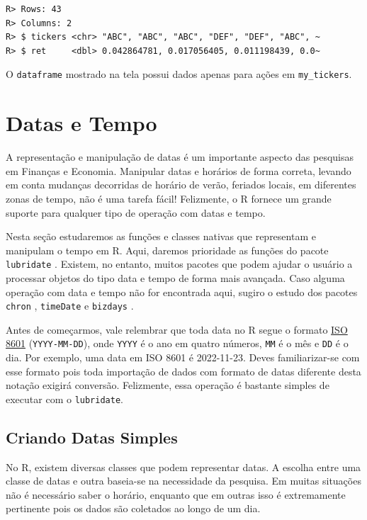 \documentclass[
  11pt,
]{book}
\begin{document}
\begin{verbatim}
R> Rows: 43
R> Columns: 2
R> $ tickers <chr> "ABC", "ABC", "ABC", "DEF", "DEF", "ABC", ~
R> $ ret     <dbl> 0.042864781, 0.017056405, 0.011198439, 0.0~
\end{verbatim}

O \texttt{dataframe} mostrado na tela possui dados apenas para ações em \texttt{my\_tickers}.

\hypertarget{datas-e-tempo}{%
\section{Datas e Tempo}\label{datas-e-tempo}}

A representação e manipulação de datas é um importante aspecto das pesquisas em Finanças e Economia. Manipular datas e horários de forma correta, levando em conta mudanças decorridas de horário de verão, feriados locais, em diferentes zonas de tempo, não é uma tarefa fácil! Felizmente, o R fornece um grande suporte para qualquer tipo de operação com datas e tempo.

Nesta seção estudaremos as funções e classes nativas que representam e manipulam o tempo em R. Aqui, daremos prioridade as funções do pacote \texttt{lubridate} \citep{R-lubridate}. Existem, no entanto, muitos pacotes que podem ajudar o usuário a processar objetos do tipo data e tempo de forma mais avançada. Caso alguma operação com data e tempo não for encontrada aqui, sugiro o estudo dos pacotes \texttt{chron} \citep{R-chron}, \texttt{timeDate} \citep{R-timeDate} e \texttt{bizdays} \citep{R-bizdays}.   

Antes de começarmos, vale relembrar que toda data no R segue o formato \href{https://www.iso.org/iso-8601-date-and-time-format.html}{ISO 8601} (\texttt{YYYY-MM-DD}), onde \texttt{YYYY} é o ano em quatro números, \texttt{MM} é o mês e \texttt{DD} é o dia. Por exemplo, uma data em ISO 8601 é 2022-11-23. Deves familiarizar-se com esse formato pois toda importação de dados com formato de datas diferente desta notação exigirá conversão. Felizmente, essa operação é bastante simples de executar com o \texttt{lubridate}.

\hypertarget{criando-datas-simples}{%
\subsection{Criando Datas Simples}\label{criando-datas-simples}}

No R, existem diversas classes que podem representar datas. A escolha entre uma classe de datas e outra baseia-se na necessidade da pesquisa. Em muitas situações não é necessário saber o horário, enquanto que em outras isso é extremamente pertinente pois os dados são coletados ao longo de um dia.
\end{document}
